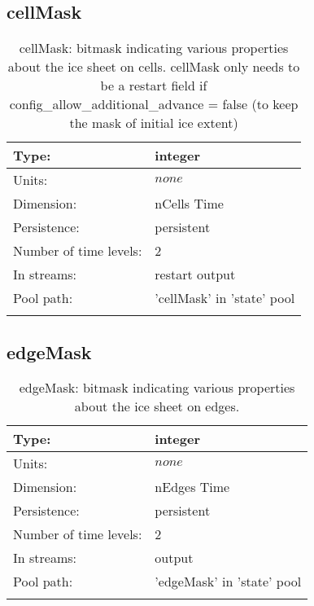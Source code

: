 \subsection[cellMask]{cellMask}
\label{subsec:var_sec_state_cellMask}
\begin{center}
\begin{longtable}{| p{2.0in} | p{4.0in} |}
        \hline 
        Type: & integer \\
        \hline 
        Units: & $none$ \\
        \hline 
        Dimension: & nCells Time \\
        \hline 
        Persistence: & persistent \\
        \hline 
        Number of time levels: & 2 \\
        \hline 
		 In streams: &  restart output \\
        \hline 
            Pool path: & 'cellMask' in 'state' pool
 \\
		 \hline 
    \caption{cellMask: bitmask indicating various properties about the ice sheet on cells.  cellMask only needs to be a restart field if config\_allow\_additional\_advance = false (to keep the mask of initial ice extent)}
\end{longtable}
\end{center}
\subsection[edgeMask]{edgeMask}
\label{subsec:var_sec_state_edgeMask}
\begin{center}
\begin{longtable}{| p{2.0in} | p{4.0in} |}
        \hline 
        Type: & integer \\
        \hline 
        Units: & $none$ \\
        \hline 
        Dimension: & nEdges Time \\
        \hline 
        Persistence: & persistent \\
        \hline 
        Number of time levels: & 2 \\
        \hline 
		 In streams: &  output \\
        \hline 
            Pool path: & 'edgeMask' in 'state' pool
 \\
		 \hline 
    \caption{edgeMask: bitmask indicating various properties about the ice sheet on edges.}
\end{longtable}
\end{center}
